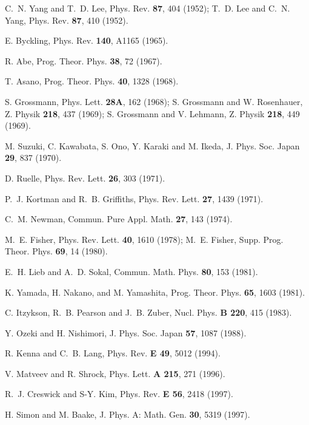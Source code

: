 \documentclass[aps,pre,showpacs,amsmath,amssymb,superscriptaddress,twocolumn]{revtex4-1}
\begin{document}
\begin{thebibliography}{99}

 C.~N. Yang and T.~D. Lee, Phys. Rev. {\bf 87}, 404 (1952); T.~D. Lee and C.~N. Yang, Phys. Rev. {\bf 87}, 410 (1952).

 E. Byckling, Phys. Rev. {\bf 140}, A1165 (1965).

 R. Abe, Prog. Theor. Phys. {\bf 38}, 72 (1967).

 T. Asano, Prog. Theor. Phys. {\bf 40}, 1328 (1968).

 S. Grossmann, Phys. Lett. {\bf 28A}, 162 (1968); S. Grossmann and W. Rosenhauer, Z. Physik {\bf 218}, 437 (1969); S. Grossmann and V. Lehmann, Z. Physik {\bf 218}, 449 (1969).

 M. Suzuki, C. Kawabata, S. Ono, Y. Karaki and M. Ikeda, J. Phys. Soc. Japan {\bf 29}, 837 (1970). 

 D. Ruelle, Phys. Rev. Lett. {\bf 26}, 303 (1971).

 P.~J. Kortman and R.~B. Griffiths, Phys. Rev. Lett. {\bf 27}, 1439 (1971).

 C.~M. Newman, Commun. Pure Appl. Math. {\bf 27}, 143 (1974).

 M.~E. Fisher, Phys. Rev. Lett. {\bf 40}, 1610 (1978); M.~E. Fisher, Supp. Prog. Theor. Phys. {\bf 69}, 14 (1980).

 E.~H. Lieb and A.~D. Sokal, Commun. Math. Phys. {\bf 80}, 153 (1981). 

 K. Yamada, H. Nakano, and M. Yamashita, Prog. Theor. Phys. {\bf 65}, 1603 (1981).

 C. Itzykson, R.~B. Pearson and J.~B. Zuber, Nucl. Phys. {\bf B 220}, 415 (1983).

 Y. Ozeki and H. Nishimori, J. Phys. Soc. Japan {\bf 57}, 1087 (1988).

 R. Kenna and C.~B. Lang, Phys. Rev. {\bf E 49}, 5012 (1994).

 V. Matveev and R. Shrock, Phys. Lett. {\bf A 215}, 271 (1996).

 R.~J. Creswick and S-Y. Kim, Phys. Rev. {\bf E 56}, 2418 (1997). 

 H. Simon and M. Baake, J. Phys. A: Math. Gen. {\bf 30}, 5319 (1997).


\end{thebibliography}
\end{document}
